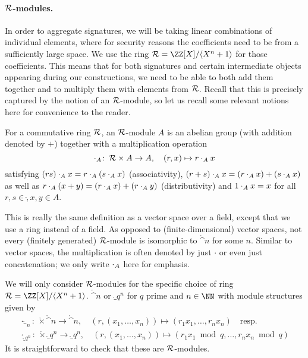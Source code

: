 \paragraph{$\mathcal{R}$-modules.}
In order to aggregate signatures, we will be taking linear combinations of individual elements, where for security reasons the coefficients need to be from a sufficiently large space. We use the ring $\ring = \defring$ for those coefficients. This means that for both signatures and certain intermediate objects appearing during our constructions, we need to be able to both add them together and to multiply them with elements from $\mathcal{R}$. Recall that this is precisely captured by the notion of an $\mathcal{R}$-module, so let us recall some relevant notions here for convenience to the reader. 
\begin{definition}
For a commutative ring $\mathcal{R}$, an $\mathcal{R}$-module $A$ is an abelian group (with addition denoted by $+$) together with a multiplication operation
\[
 \mathbin{\cdot_A}\colon\,\mathcal{R}\times A \to A,\quad (r, x)\mapsto r\mathbin{\cdot_A} x
\]
satisfying $(rs)\mathbin{\cdot_A} x = r\mathbin{\cdot_A} (s\mathbin{\cdot_A} x)$ (associativity), $(r+s)\mathbin{\cdot_A} x = (r\mathbin{\cdot_A} x) + (s\mathbin{\cdot_A} x)$ as well as $r\mathbin{\cdot_A}(x + y) = (r\mathbin{\cdot_A} x) + (r\mathbin{\cdot_A} y)$ (distributivity) and $1\mathbin{\cdot_A} x = x$ for all $r,s\in\ring, x,y\in A$.
\end{definition}
This is really the same definition as a vector space over a field, except that we use a ring instead of a field. As opposed to (finite-dimensional) vector spaces, not every (finitely generated) $\mathcal{R}$-module is isomorphic to $\ring^n$ for some $n$. Similar to vector spaces, the multiplication is often denoted by just $\cdot$ or even just concatenation; we only write $\mathbin{\cdot_A}$ here for emphasis.

We will only consider $\mathcal{R}$-modules for the specific choice of ring $\ring = \defring$.  $\ring^n$ or $\ring_q^n$ for $q$ prime and $n\in\NN$ with module structures given by
\begin{align*}
 \cdot_{\ring^n}\colon\, \ring \times \ring^n \to \ring^n, \quad (r,(x_1,\ldots, x_n))\mapsto (r_1x_1,\ldots,r_nx_n)\quad\text{resp.}\\
 \cdot_{\ring_q^n}\colon\, \ring \times \ring_q^n \to \ring_q^n,\quad (r,(x_1,\ldots, x_n)) \mapsto (r_1x_1\bmod q,\ldots, r_nx_n\bmod q)
\end{align*}
It is straightforward to check that these are $\mathcal{R}$-modules.

